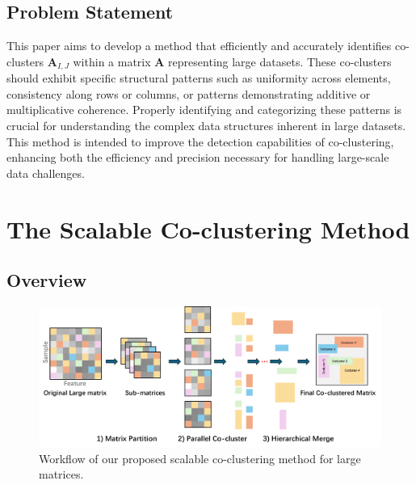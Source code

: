 \documentclass[journal]{IEEEtran}
\newtheorem{definition}{Definition}
\begin{document}



\subsection{Problem Statement}
This paper aims to develop a method that efficiently and accurately identifies co-clusters $\mathbf{A}_{I, J}$ within a matrix $\mathbf{A}$ representing large datasets. These co-clusters should exhibit specific structural patterns such as uniformity across elements, consistency along rows or columns, or patterns demonstrating additive or multiplicative coherence. Properly identifying and categorizing these patterns is crucial for understanding the complex data structures inherent in large datasets. This method is intended to improve the detection capabilities of co-clustering, enhancing both the efficiency and precision necessary for handling large-scale data challenges.

\section{The Scalable Co-clustering Method}
\label{sec:method}
\subsection{Overview}

\begin{figure}[htbp]
  \centering
  \includegraphics[width=0.8\linewidth]{workflow.png}
  \caption{Workflow of our proposed scalable co-clustering method for large matrices.}
  \label{fig:workflow}
\end{figure}
\end{document}
